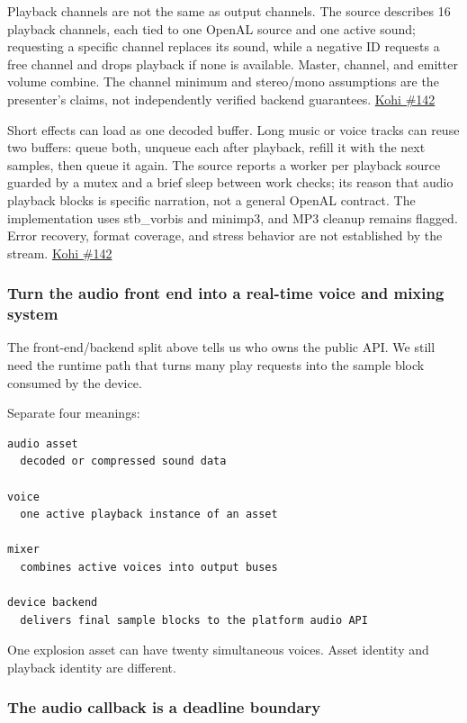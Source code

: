Playback channels are not the same as output channels. The source describes 16 playback channels, each tied to one OpenAL source and one active sound; requesting a specific channel replaces its sound, while a negative ID requests a free channel and drops playback if none is available. Master, channel, and emitter volume combine. The channel minimum and stereo/mono assumptions are the presenter's claims, not independently verified backend guarantees. \href{https://www.youtube.com/watch?v=xb23Y9o7tP4}{Kohi \#142}

Short effects can load as one decoded buffer. Long music or voice tracks can reuse two buffers: queue both, unqueue each after playback, refill it with the next samples, then queue it again. The source reports a worker per playback source guarded by a mutex and a brief sleep between work checks; its reason that audio playback blocks is specific narration, not a general OpenAL contract. The implementation uses stb\_vorbis and minimp3, and MP3 cleanup remains flagged. Error recovery, format coverage, and stress behavior are not established by the stream. \href{https://www.youtube.com/watch?v=xb23Y9o7tP4}{Kohi \#142}

\subsubsection{Turn the audio front end into a real-time voice and mixing system}\label{05-engine-i-ch009-turn-the-audio-front-end-into-a-real-time-voice-and-mixing-system}

The front-end/backend split above tells us who owns the public API. We still need the runtime path that turns many play requests into the sample block consumed by the device.

Separate four meanings:

\begin{verbatim}
audio asset
  decoded or compressed sound data

voice
  one active playback instance of an asset

mixer
  combines active voices into output buses

device backend
  delivers final sample blocks to the platform audio API
\end{verbatim}

One explosion asset can have twenty simultaneous voices. Asset identity and playback identity are different.

\subsubsection{The audio callback is a deadline boundary}\label{05-engine-i-ch009-the-audio-callback-is-a-deadline-boundary}

